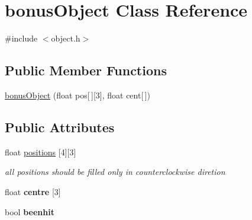 \hypertarget{classbonusObject}{\section{bonus\-Object \-Class \-Reference}
\label{classbonusObject}
}


{\ttfamily \#include $<$object.\-h$>$}

\subsection*{\-Public \-Member \-Functions}
\begin{DoxyCompactItemize}
\item 
\hyperlink{classbonusObject_afbd5bcfbce7dbb8c8c12bf6bbe7731ea}{bonus\-Object} (float pos\mbox{[}$\,$\mbox{]}\mbox{[}3\mbox{]}, float cent\mbox{[}$\,$\mbox{]})
\end{DoxyCompactItemize}
\subsection*{\-Public \-Attributes}
\begin{DoxyCompactItemize}
\item 
\hypertarget{classbonusObject_a72ba79c158730de1502fcfcf13221a9e}{float \hyperlink{classbonusObject_a72ba79c158730de1502fcfcf13221a9e}{positions} \mbox{[}4\mbox{]}\mbox{[}3\mbox{]}}\label{classbonusObject_a72ba79c158730de1502fcfcf13221a9e}

\begin{DoxyCompactList}\small\item\em all positions should be filled only in counterclockwise diretion \end{DoxyCompactList}\item 
\hypertarget{classbonusObject_ae5e68fd04d1cbb52116062621c697c87}{float {\bfseries centre} \mbox{[}3\mbox{]}}\label{classbonusObject_ae5e68fd04d1cbb52116062621c697c87}

\item 
\hypertarget{classbonusObject_a918f57e4bf48b18d481c35c4527162fa}{bool {\bfseries beenhit}}\label{classbonusObject_a918f57e4bf48b18d481c35c4527162fa}

\end{DoxyCompactItemize}
